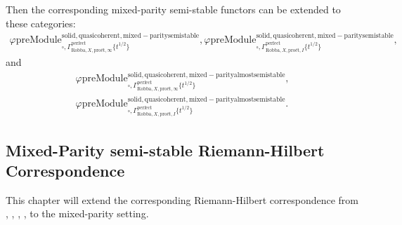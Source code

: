 \documentclass[12pt]{book}
\theoremstyle{definition}
\begin{document}
\indent Then the corresponding mixed-parity semi-stable functors can be extended to these categories:
\begin{align}
\varphi\mathrm{preModule}^\mathrm{solid,quasicoherent,mixed-paritysemistable}_{\square,\Gamma^\mathrm{perfect}_{\text{Robba},X,\text{pro\'et},\infty}\{t^{1/2}\}},
\varphi\mathrm{preModule}^\mathrm{solid,quasicoherent,mixed-paritysemistable}_{\square,\Gamma^\mathrm{perfect}_{\text{Robba},X,\text{pro\'et},I}\{t^{1/2}\}}, 
\end{align}
and
\begin{align}
\varphi\mathrm{preModule}^\mathrm{solid,quasicoherent,mixed-parityalmostsemistable}_{\square,\Gamma^\mathrm{perfect}_{\text{Robba},X,\text{pro\'et},\infty}\{t^{1/2}\}},\\
\varphi\mathrm{preModule}^\mathrm{solid,quasicoherent,mixed-parityalmostsemistable}_{\square,\Gamma^\mathrm{perfect}_{\text{Robba},X,\text{pro\'et},I}\{t^{1/2}\}}. 
\end{align}








\subsection{Mixed-Parity semi-stable Riemann-Hilbert Correspondence}


\indent This chapter will extend the corresponding Riemann-Hilbert correspondence from \cite{Sch1}, \cite{LZ}, \cite{BL1}, \cite{BL2}, \cite{M} to the mixed-parity setting.
\end{document}
